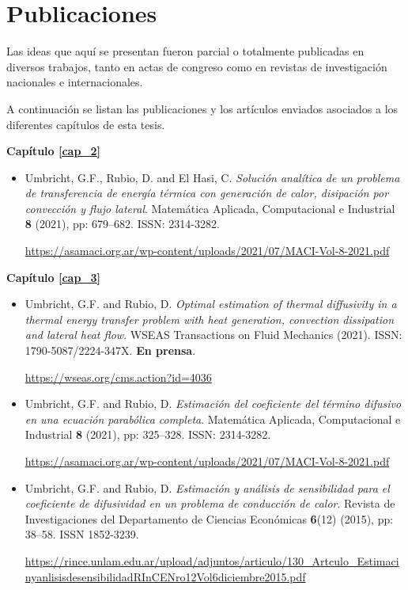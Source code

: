 \chapter*{Publicaciones}

Las ideas que aqu\'i se presentan fueron parcial o totalmente publicadas en diversos trabajos, tanto en actas de congreso como en revistas de investigaci\'on nacionales e internacionales. 

A continuaci\'on se listan las publicaciones y los art\'iculos enviados asociados a los diferentes cap\'itulos de esta tesis. 


{\bf Cap\'itulo \ref{cap_2}}    

\begin{itemize}

%
\item{Umbricht, G.F., Rubio, D. and El Hasi, C. {\em Soluci\'on anal\'itica de un problema de transferencia de energ\'ia t\'ermica con generaci\'on de calor, disipaci\'on por convecci\'on y flujo lateral}. Matem\'atica Aplicada, Computacional e Industrial {\bf 8} (2021), pp: 679--682. ISSN: 2314-3282.}

\sloppy
\url{https://asamaci.org.ar/wp-content/uploads/2021/07/MACI-Vol-8-2021.pdf} 
%
\end{itemize}

{\bf Cap\'itulo \ref{cap_3}}  

\begin{itemize}

\item{Umbricht, G.F. and Rubio, D. {\em Optimal estimation of thermal diffusivity in a thermal energy transfer problem with heat generation, convection dissipation and
lateral heat flow}. WSEAS Transactions on Fluid Mechanics (2021). ISSN: 1790-5087/2224-347X. {\bf En prensa}.}

\url{https://wseas.org/cms.action?id=4036}
%
\item{Umbricht, G.F. and Rubio, D. {\em Estimaci\'on del coeficiente del t\'ermino difusivo en una ecuaci\'on parab\'olica completa}. Matem\'atica Aplicada, Computacional e Industrial {\bf 8} (2021), pp: 325--328. ISSN: 2314-3282.}

\sloppy
\url{https://asamaci.org.ar/wp-content/uploads/2021/07/MACI-Vol-8-2021.pdf} 
%
%
\item{Umbricht, G.F. and Rubio, D. {\em Estimaci\'on y an\'alisis de sensibilidad para el coeficiente de difusividad en un problema de conducci\'on de calor}. Revista de Investigaciones del Departamento de Ciencias Econ\'omicas {\bf 6}(12) (2015), pp: 38--58. ISSN 1852-3239.}

\sloppy
\url{https://rince.unlam.edu.ar/upload/adjuntos/articulo/130_Artculo_EstimacinyanlisisdesensibilidadRInCENro12Vol6diciembre2015.pdf} 
%
\end{itemize}

